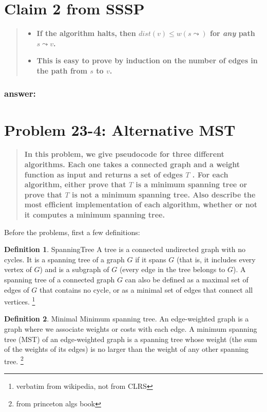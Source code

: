\documentclass[titlepage]{article}
\theoremstyle{definition}
\newtheorem{definition}{Definition}[section]
\begin{document}
\section{Claim 2 from SSSP}
\begin{quote}
\begin{itemize}
  \item \textbf{ If the algorithm halts, then $dist(v) \leq w(s \leadsto )$
	  for \emph{any} path $s \leadsto v$.}
  \item \textbf{This is easy to prove by induction on the number of edges in
	the path from $s$ to $v$.}
\end{itemize}
\end{quote}
\subsubsection{answer:}



\section{Problem 23-4: Alternative MST}

\begin{quote}
  \textbf{ In this problem, we give pseudocode for three different algorithms.
	Each one takes a connected graph and a weight function as input and returns
	a set of edges $T$ .  For each algorithm, either prove that $T$ is a
	minimum spanning tree or prove that $T$ is not a minimum spanning tree.
	Also describe the most efﬁcient implementation of each algorithm, whether or
	not it computes a minimum spanning tree.  }
\end{quote}

Before the problems, first a few definitions:

\theoremstyle{definition}
\begin{definition}{SpanningTree}
  A tree is a connected undirected graph with no cycles. It is a spanning tree
  of a graph $G$ if it spans $G$ (that is, it includes every vertex of $G$) and is a
  subgraph of $G$ (every edge in the tree belongs to $G$). A spanning tree of a
  connected graph $G$ can also be defined as a maximal set of edges of $G$ that
  contains no cycle, or as a minimal set of edges that connect all vertices.
  \footnote{verbatim from wikipedia, not from CLRS}
\end{definition}
\begin{definition}{Minimal}
  Minimum spanning tree. An edge-weighted graph is a graph where we associate
  weights or costs with each edge. A minimum spanning tree (MST) of an
  edge-weighted graph is a spanning tree whose weight (the sum of the weights
  of its edges) is no larger than the weight of any other spanning tree.
  \footnote{from princeton algs book}
\end{definition}
\end{document}
